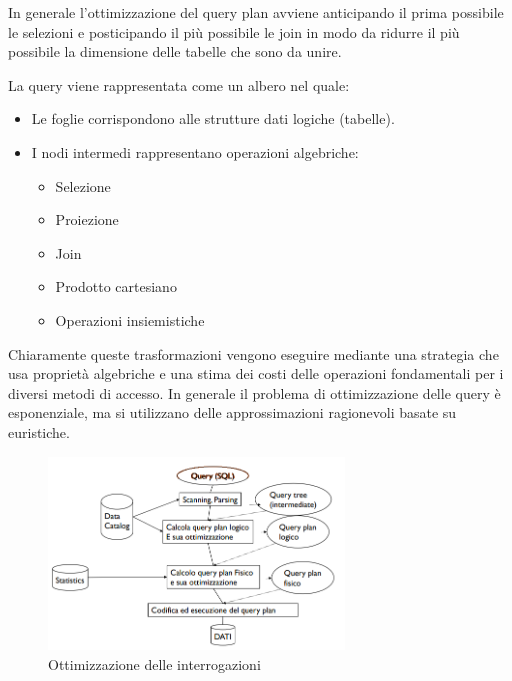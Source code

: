 \begin{nota}
    In generale l'ottimizzazione del query plan avviene anticipando il prima possibile
    le selezioni e posticipando il più possibile le join in modo da ridurre il più
    possibile la dimensione delle tabelle che sono da unire.
\end{nota}

\begin{definizione}
    La query viene rappresentata come un albero nel quale:
    \begin{itemize}
        \item Le foglie corrispondono alle strutture dati logiche (tabelle).
        \item I nodi intermedi rappresentano operazioni algebriche:
              \begin{itemize}
                  \item Selezione
                  \item Proiezione
                  \item Join
                  \item Prodotto cartesiano
                  \item Operazioni insiemistiche
              \end{itemize}
    \end{itemize}
\end{definizione}
Chiaramente queste trasformazioni vengono eseguire mediante una strategia che
usa proprietà algebriche e una stima dei costi delle operazioni fondamentali per
i diversi metodi di accesso. In generale il problema di ottimizzazione delle
query è esponenziale, ma si utilizzano delle approssimazioni ragionevoli basate
su euristiche.
\begin{figure}
    \centering
    \includegraphics[width=0.7\textwidth]{./img/DBMS/Ottimizzazione_query.png}
    \caption{Ottimizzazione delle interrogazioni}
    \label{fig:Query_Optimization}
\end{figure}
